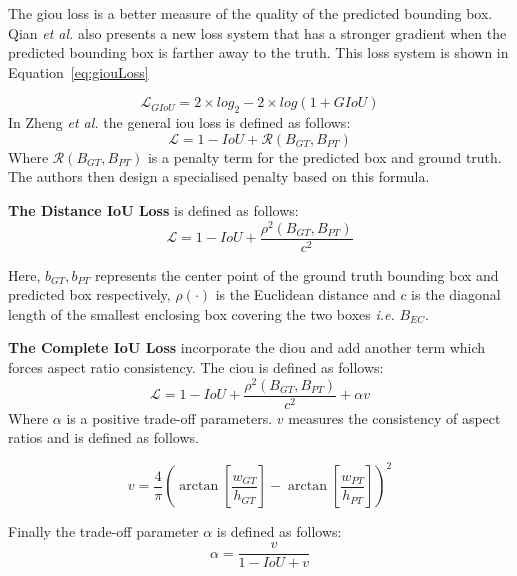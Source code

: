 The \gls{giou} loss is a better measure of the quality of the predicted bounding box. Qian \textit{et al.} also presents a new loss system that has a stronger gradient when the predicted bounding box is farther away to the truth. This loss system is shown in Equation~\ref{eq:giouLoss}

\begin{equation}\label{eq:giouLoss}
	\mathcal{L}_{GIoU} = 2 \times log_2 - 2 \times log(1 + GIoU)
\end{equation}
In Zheng \textit{et al.}\cite{diou} the general \gls{iou} loss is defined as follows:
\begin{equation}
	\mathcal{L} = 1 - IoU + \mathcal{R}(B_{GT}, B_{PT})
\end{equation}
Where  $\mathcal{R}(B_{GT}, B_{PT})$ is a penalty term for the predicted box and ground truth. The authors then design a specialised penalty based on this formula.

\textbf{The Distance IoU Loss} is defined as follows:
\begin{equation}
	\mathcal{L} = 1 - IoU + \frac {\rho^2(B_{GT}, B_{PT})}{c^2}
	\label{eq:diouLoss}
\end{equation}

Here, $b_{GT}, b_{PT}$ represents the center point of the ground truth bounding box and predicted box respectively, $\rho(\cdot)$ is the Euclidean distance and $c$ is the diagonal length of the smallest enclosing box covering the two boxes \textit{i.e.} $B_{EC}$.

\textbf{The Complete IoU Loss} incorporate the \gls{diou} and add another term which forces aspect ratio consistency. The \gls{ciou} is defined as follows:
\begin{equation}
	\mathcal{L} = 1 - IoU + \frac {\rho^2(B_{GT}, B_{PT})}{c^2} + \alpha v 
	\label{eq:ciouLoss}
\end{equation}
Where $\alpha$ is a positive trade-off parameters. $v$ measures the consistency of aspect ratios and is defined as follows.

\begin{equation}
	v = \frac{4}{\pi}(\arctan[\frac{w_{GT}}{h_{GT}}] -    \arctan[\frac{w_{PT}}{h_{PT}}])^2
	\label{eq:AspectRatio}
\end{equation}

Finally the trade-off parameter $\alpha$ is defined as follows:
\begin{equation}
	\alpha = \frac{v}{1 - IoU + v}
\end{equation}


